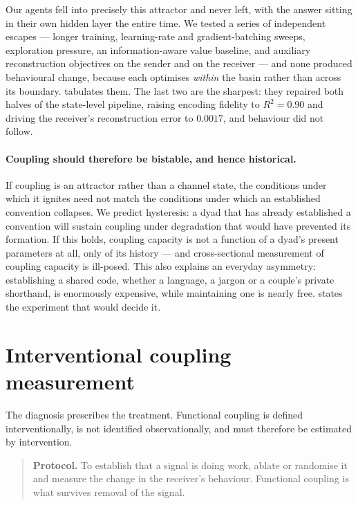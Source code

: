 \documentclass[11pt,a4paper]{article}
\theoremstyle{plain}
\theoremstyle{definition}
\theoremstyle{remark}
\begin{document}
Our agents fell into precisely this attractor and never left, with the answer sitting in their own
hidden layer the entire time. We tested a series of independent escapes --- longer training,
learning-rate and gradient-batching sweeps, exploration pressure, an information-aware value baseline,
and auxiliary reconstruction objectives on the sender and on the receiver --- and none produced
behavioural change, because each optimises \emph{within} the basin rather than across its boundary.
 tabulates them. The last two are the sharpest: they repaired both halves of the
state-level pipeline, raising encoding fidelity to $R^2 = 0.90$ and driving the receiver's
reconstruction error to $0.0017$, and behaviour did not follow.

\paragraph{Coupling should therefore be bistable, and hence historical.}
If coupling is an attractor rather than a channel state, the conditions under which it ignites need
not match the conditions under which an established convention collapses. We predict hysteresis: a
dyad that has already established a convention will sustain coupling under degradation that would
have prevented its formation. If this holds, coupling capacity is not a function of a dyad's present
parameters at all, only of its history --- and cross-sectional measurement of coupling capacity is
ill-posed. This also explains an everyday asymmetry: establishing a shared code, whether a language, a
jargon or a couple's private shorthand, is enormously expensive, while maintaining one is nearly free.
 states the experiment that would decide it.

\section{Interventional coupling measurement}\label{sec:remedy}

The diagnosis prescribes the treatment. Functional coupling is defined interventionally, is not
identified observationally, and must therefore be estimated by intervention.

\begin{quote}
\textbf{Protocol.} To establish that a signal is doing work, ablate or randomise it and measure the
change in the receiver's behaviour. Functional coupling is what survives removal of the signal.
\end{quote}
\end{document}
